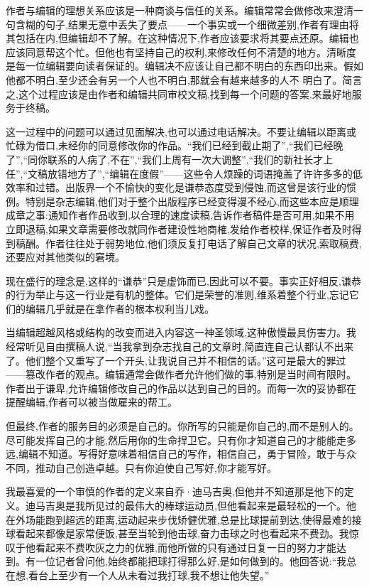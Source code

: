 作者与编辑的理想关系应该是一种商谈与信任的关系。编辑常常会做修改来澄清一句含糊的句子,结果无意中丢失了要点——一个事实或一个细微差别,作者有理由将其包括在内,但编辑却不了解。在这种情况下,作者应该要求将其要点还原。编辑也应该同意帮这个忙。但他也有坚持自己的权利,来修改任何不清楚的地方。清晰度是每一位编辑要向读者保证的。编辑决不应该让自己都不明白的东西印出来。假如他都不明白,至少还会有另一个人也不明白,那就会有越来越多的人不 明白了。简言之,这个过程应该是由作者和编辑共同审校文稿,找到每一个问题的答案,来最好地服务于终稿。

这一过程中的问题可以通过见面解决,也可以通过电话解决。不要让编辑以距离或忙碌为借口,未经你的同意修改你的作品。“我们已经到截止期了”,“我们已经晚了”,“同你联系的人病了,不在”,“我们上周有一次大调整”,“我们的新社长才上任”,“文稿放错地方了”,“编辑在度假”——这些令人烦躁的词语掩盖了许许多多的低效率和过错。出版界一个不愉快的变化是谦恭态度受到侵蚀,而这曾是该行业的惯例。特别是杂志编辑,他们对于整个出版程序已经变得漫不经心,而这些本应是顺理成章之事:通知作者作品收到,以合理的速度读稿,告诉作者稿件是否可用,如果不用立即退稿,如果文章需要修改就同作者建设性地商榷,发给作者校样,保证作者及时得到稿酬。作者往往处于弱势地位,他们须反复打电话了解自己文章的状况,索取稿费,还要应对其他类似的窘境。

现在盛行的理念是,这样的“谦恭”只是虚饰而已,因此可以不要。事实正好相反,谦恭的行为举止与这一行业是有机的整体。它们是荣誉的准则,维系着整个行业,忘记它们的编辑几乎就是在拿作者的根本权利当儿戏。

当编辑超越风格或结构的改变而进入内容这一神圣领域,这种傲慢最具伤害力。我经常听见自由撰稿人说,“当我拿到杂志找自己的文章时,简直连自己认都认不出来了。他们整个又重写了一个开头,让我说自己并不相信的话。”这可是最大的罪过——篡改作者的观点。编辑通常会做作者允许他们做的事,特别是当时间有限时。作者出于谦卑,允许编辑修改自己的作品以达到自己的目的。而每一次的妥协都在提醒编辑,作者可以被当做雇来的帮工。

但最终,作者的服务目的必须是自己的。你所写的只能是你自己的,而不是别人的。尽可能发挥自己的才能,然后用你的生命捍卫它。只有你才知道自己的才能能走多远,编辑不知道。写得好意味着相信自己的写作，相信自己，勇于冒险，敢于与众不同，推动自己创造卓越。只有你迫使自己写好,你才能写好。

我最喜爱的一个审慎的作者的定义来自乔·迪马吉奥,但他并不知道那是他下的定义。迪马吉奥是我所见过的最伟大的棒球运动员,但他看起来是最轻松的一个。他在外场能跑到超远的距离,运动起来步伐矫健优雅,总是比球提前到达,使得最难的接球看起来都像是家常便饭,甚至当轮到他击球,奋力击球之时也看起来不费劲。我惊叹于他看起来不费吹灰之力的优雅,而他所做的只有通过日复一日的努力才能达到。有一位记者曾问他,始终都能把球打得那么好,是如何做到的。他回答说:“我总在想,看台上至少有一个人从未看过我打球,我不想让他失望。”